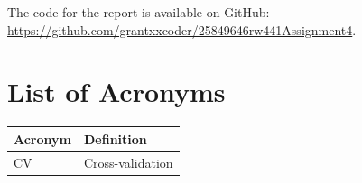 \documentclass[conference]{IEEEtran}
\begin{document}
The code for the report is available on GitHub: \url{https://github.com/grantxxcoder/25849646rw441Assignment4}.
\appendix

\section*{List of Acronyms}
\begingroup
\setlength{\tabcolsep}{6pt}
\renewcommand{\arraystretch}{1.05}
\noindent\begin{tabular}{@{}p{}p{}@{}}
\textbf{Acronym} & \textbf{Definition} \\
\midrule
CV & Cross-validation \\
\end{tabular}
\endgroup



\end{document}
